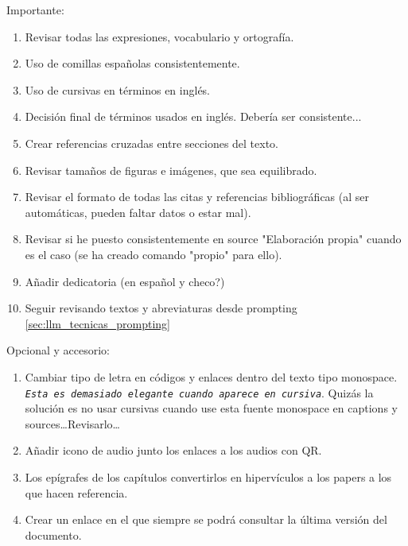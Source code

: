 Importante:
  \begin{enumerate}
    \item Revisar todas las expresiones, vocabulario y ortografía.
    \item Uso de comillas españolas consistentemente.
    \item Uso de cursivas en términos en inglés.
    \item Decisión final de términos usados en inglés. Debería ser consistente...
    \item Crear referencias cruzadas entre secciones del texto.
    \item Revisar tamaños de figuras e imágenes, que sea equilibrado.
    \item Revisar el formato de todas las citas y referencias bibliográficas (al ser automáticas, pueden faltar datos o estar mal).
    \item Revisar si he puesto consistentemente en source "Elaboración propia" cuando es el caso (se ha creado comando "propio" para ello).
    \item Añadir dedicatoria (en español y checo?) %
    \item Seguir revisando textos y abreviaturas desde prompting \ref{sec:llm_tecnicas_prompting}
  \end{enumerate}

  
  Opcional y accesorio:
  \begin{enumerate}
    \item Cambiar tipo de letra en códigos y enlaces dentro del texto tipo monospace. \texttt{\textit{Esta es demasiado elegante cuando aparece en cursiva}}. Quizás la solución es no usar cursivas cuando use esta fuente monospace en captions y sources\dots Revisarlo\dots
    \item Añadir icono de audio junto los enlaces a los audios con QR.
    \item Los epígrafes de los capítulos convertirlos en hipervículos a los papers a los que hacen referencia.
    \item Crear un enlace en el que siempre se podrá consultar la última versión del documento.
  \end{enumerate}



